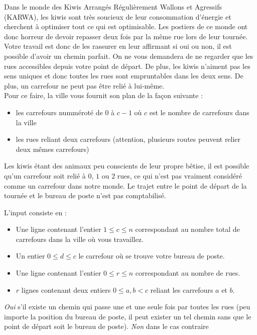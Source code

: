 

Dans le monde des Kiwis Arrangés Régulièrement Wallons et Agressifs (KARWA), les kiwis sont très soucieux de leur consommation d'énergie et cherchent à optimiser tout ce qui est optimisable. Les postiers de ce monde ont donc horreur de devoir repasser deux fois par la même rue lors de leur tournée. Votre travail est donc de les rassurer en leur affirmant si oui ou non, il est possible d'avoir un chemin parfait. On ne vous demandera de ne regarder que les rues accessibles depuis votre point de départ. De plus, les kiwis n'aiment pas les sens uniques et donc toutes les rues sont empruntables dans les deux sens. De plus, un carrefour ne peut pas être relié à lui-même.\\
Pour ce faire, la ville vous fournit son plan de la façon suivante :


\begin{itemize}
\item les carrefours numméroté de 0 à $c-1$ où $c$ est le nombre de carrefours dans la ville
\item les rues reliant deux carrefours (attention, plusieurs routes peuvent relier deux mêmes carrefours)
\end{itemize}
Les kiwis étant des animaux peu conscients de leur propre bêtise, il est possible qu'un carrefour soit relié à $0$, $1$ ou $2$ rues, ce qui n'est pas vraiment considéré comme un carrefour dans notre monde.
Le trajet entre le point de départ de la tournée et le bureau de poste n'est pas comptabilisé. 

\begin{Input}
    L'input consiste en :
    \begin{itemize}
        \item Une ligne contenant l'entier $1 \leq c \leq n$ correspondant au nombre total de carrefours dans la ville où vous travaillez.
        \item Un entier $0\leq d \leq c$ le carrefour où se trouve votre bureau de poste.
        \item Une ligne contenant l'entier $0 \leq r \leq n$ correspondant au nombre de rues.
        \item $r$ lignes contenant deux entiers $0\leq a,b < c$ reliant les carrefours $a$ et $b$.
    \end{itemize}
\end{Input}

\begin{Output}
    \emph{Oui} s'il existe un chemin qui passe une et une seule fois par toutes les rues (peu importe la position du bureau de poste, il peut exister un tel chemin sans que le point de départ soit le bureau de poste). \emph{Non} dans le cas contraire
\end{Output}
